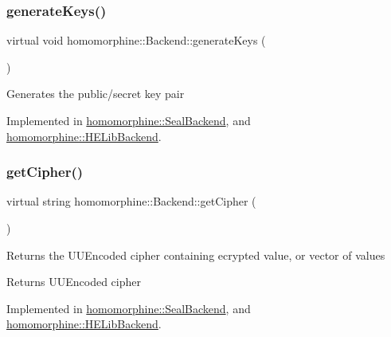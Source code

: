 \subsubsection{\texorpdfstring{generateKeys()}{generateKeys()}}
{\footnotesize\ttfamily virtual void homomorphine\+::\+Backend\+::generate\+Keys (\begin{DoxyParamCaption}{ }\end{DoxyParamCaption})\hspace{0.3cm}{\ttfamily [pure virtual]}}

Generates the public/secret key pair 

Implemented in \mbox{\hyperlink{classhomomorphine_1_1_seal_backend_a1e2ed46b896d4a5b5d930ec7bcd3207b}{homomorphine\+::\+Seal\+Backend}}, and \mbox{\hyperlink{classhomomorphine_1_1_h_e_lib_backend_a2c6ed82eeb597b99ae6cdb2734412a0f}{homomorphine\+::\+H\+E\+Lib\+Backend}}.

\mbox{\label{classhomomorphine_1_1_backend_a6c6ed25dec9809b3f216e185e8026e97}} 
\subsubsection{\texorpdfstring{getCipher()}{getCipher()}}
{\footnotesize\ttfamily virtual string homomorphine\+::\+Backend\+::get\+Cipher (\begin{DoxyParamCaption}{ }\end{DoxyParamCaption})\hspace{0.3cm}{\ttfamily [pure virtual]}}

Returns the U\+U\+Encoded cipher containing ecrypted value, or vector of values

\begin{DoxyReturn}{Returns}
U\+U\+Encoded cipher 
\end{DoxyReturn}


Implemented in \mbox{\hyperlink{classhomomorphine_1_1_seal_backend_a0917c586791e74b83f4ca0932e5e4d8e}{homomorphine\+::\+Seal\+Backend}}, and \mbox{\hyperlink{classhomomorphine_1_1_h_e_lib_backend_a9ba4311289e3b8c47f389f4f44de7d5d}{homomorphine\+::\+H\+E\+Lib\+Backend}}.

\mbox{\label{classhomomorphine_1_1_backend_a4c1062db09f76c74640f70b451d70729}} 
